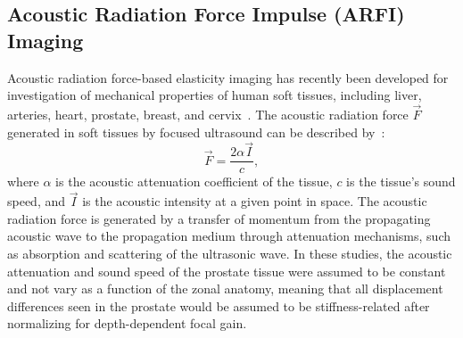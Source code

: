 \subsection{Acoustic Radiation Force Impulse (ARFI) Imaging}
Acoustic radiation force-based elasticity imaging has recently been developed
for investigation of mechanical properties of human soft tissues, including
liver, arteries, heart, prostate, breast, and cervix~\cite{Bouchard2009,Dumont2009,Trahey2004,Dahl2009,proc_congdon04,Palmeri2011,Zhai2010a,hsu07,Palmeri2011a,Palmeri2013}.
The acoustic radiation force $\vec{F}$ generated in soft tissues by
focused ultrasound can be described by~\cite{nyborg65,torr84}:
\begin{equation}
\vec{F} = \frac{2 \alpha \vec{I}}{c},
\label{eqn:radforce}
\end{equation}
where $\alpha$ is the acoustic attenuation coefficient of the tissue, $c$ is
the tissue's sound speed, and $\vec{I}$ is the acoustic intensity at a given
point in space.  The acoustic radiation force is generated by a transfer of
momentum from the propagating acoustic wave to the propagation medium through
attenuation mechanisms, such as absorption and scattering of the ultrasonic
wave.  In these studies, the acoustic attenuation and sound speed of the
prostate tissue were assumed to be constant and not vary as a function of the
zonal anatomy, meaning that all displacement differences seen in the prostate
would be assumed to be stiffness-related after normalizing for depth-dependent
focal gain.

